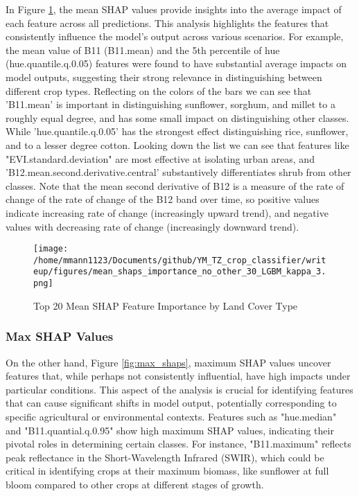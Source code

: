 \documentclass[journal]{IEEEtran}
\begin{document}
In Figure \ref{fig:mean_shaps}, the mean SHAP values provide insights into the average impact of each feature across all predictions. This analysis highlights the features that consistently influence the model's output across various scenarios. For example, the mean value of B11 (B11.mean) and the 5th percentile of hue (hue.quantile.q.0.05) features were found to have substantial average impacts on model outputs, suggesting their strong relevance in distinguishing between different crop types. Reflecting on the colors of the bars we can see that 'B11.mean' is important in distinguishing sunflower, sorghum, and millet to a roughly equal degree, and has some small impact on distinguishing other classes. While 'hue.quantile.q.0.05' has the strongest effect distinguishing rice, sunflower, and to a lesser degree cotton. Looking down the list we can see that features like "EVI.standard.deviation" are most effective at isolating urban areas, and 'B12.mean.second.derivative.central' substantively differentiates shrub from other classes. Note that the mean second derivative of B12 is a measure of the rate of change of the rate of change of the B12 band over time, so positive values indicate increasing rate of change (increasingly upward trend), and negative values with decreasing rate of change (increasingly downward trend).

\begin{figure}[!t]
    \centering
    \texttt{[image: /home/mmann1123/Documents/github/YM\_TZ\_crop\_classifier/writeup/figures/mean\_shaps\_importance\_no\_other\_30\_LGBM\_kappa\_3.png]} %
    \caption{Top 20 Mean SHAP Feature Importance by Land Cover Type}
    \label{fig:mean_shaps} %
\end{figure}

\subsubsection{Max SHAP Values}
On the other hand, Figure \ref{fig:max_shaps}, maximum SHAP values uncover features that, while perhaps not consistently influential, have high impacts under particular conditions. This aspect of the analysis is crucial for identifying features that can cause significant shifts in model output, potentially corresponding to specific agricultural or environmental contexts. Features such as "hue.median" and "B11.quantial.q.0.95" show high maximum SHAP values, indicating their pivotal roles in determining certain classes. For instance,  "B11.maximum" reflects peak reflectance in the Short-Wavelength Infrared (SWIR), which could be critical in identifying crops at their maximum biomass, like sunflower at full bloom compared to other crops at different stages of growth. 
\end{document}
